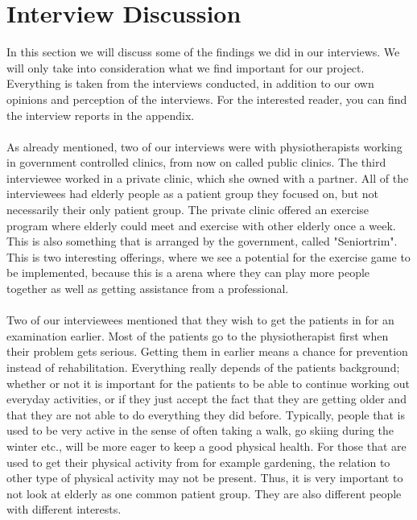 \section{Interview Discussion}
In this section we will discuss some of the findings we did in our interviews. We will only take into consideration what we find important for our project. Everything is taken from the interviews conducted, in addition to our own opinions and perception of the interviews. For the interested reader, you can find the interview reports in the appendix.\\ \\
As already mentioned, two of our interviews were with physiotherapists working in government controlled clinics, from now on called public clinics. The third interviewee worked in a private clinic, which she owned with a partner. All of the interviewees had elderly people as a patient group they focused on, but not necessarily their only patient group. The private clinic offered an exercise program where elderly could meet and exercise with other elderly once a week. This is also something that is arranged by the government, called "Seniortrim". This is two interesting offerings, where we see a potential for the exercise game to be implemented, because this is a arena where they can play more people together as well as getting assistance from a professional. \\ \\
Two of our interviewees mentioned that they wish to get the patients in for an examination earlier. Most of the patients go to the physiotherapist first when their problem gets serious. Getting them in earlier means a chance for prevention instead of rehabilitation. Everything really depends of the patients background; whether or not it is important for the patients to be able to continue working out everyday activities, or if they just accept the fact that they are getting older and that they are not able to do everything they did before. Typically, people that is used to be very active in the sense of often taking a walk, go skiing during the winter etc., will be more eager to keep a good physical health. For those that are used to get their physical activity from for example gardening, the relation to other type of physical activity may not be present. Thus, it is very important to not look at elderly as one common patient group. They are also different people with different interests.\\ \\
